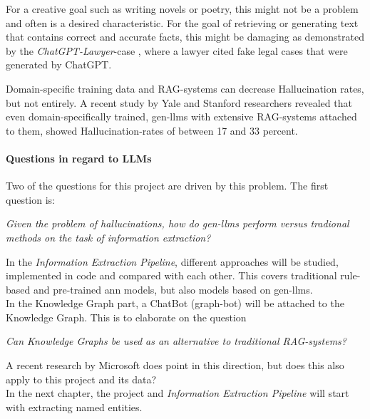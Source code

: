 For a creative goal such as writing novels or poetry, this might not be a problem and often is a desired characteristic.
For the goal of retrieving or generating text that contains correct and accurate facts, this might be damaging as demonstrated by the \emph{ChatGPT-Lawyer}-case \cite{WebsiteChatGPTLawyer}, where a lawyer cited fake legal cases that were generated by ChatGPT.

Domain-specific training data and \gls{RAG}-systems can decrease \gls{Hallucination} rates, but not entirely.
A recent study \cite{hallucinationlegal} by Yale and Stanford researchers revealed that even domain-specifically trained, \glspl{gen-llm}
with extensive \gls{RAG}-systems attached to them, showed \gls{Hallucination}-rates of between 17 and 33 percent.

\paragraph{Questions in regard to LLMs}
Two of the questions for this project are driven by this problem.
The first question is:
\begin{center}
	\emph{Given the problem of hallucinations, how do \glspl{gen-llm} perform versus tradional methods on the task of information extraction?}
\end{center}
In the \emph{Information Extraction Pipeline}, different approaches will be studied, implemented in code and compared with each other.
This covers traditional rule-based and pre-trained \gls{ann} models, but also models based on \glspl{gen-llm}.\\

In the Knowledge Graph part, a ChatBot (\gls{graph-bot}) will be attached to the Knowledge Graph.
This is to elaborate on the question
\begin{center}
	\emph{Can Knowledge Graphs be used as an alternative to traditional RAG-systems?}
\end{center}
A recent research by Microsoft \cite{graphrag} does point in this direction, but does this also apply to this project and its data?\\

In the next chapter, the project and \emph{Information Extraction Pipeline} will start with extracting named entities.




